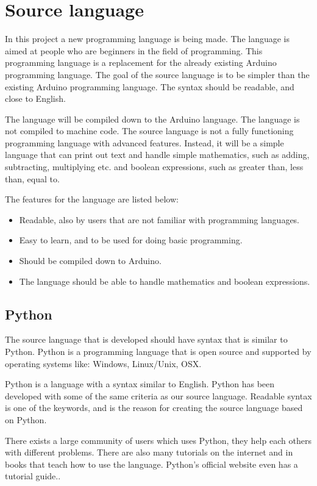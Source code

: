 \section{Source language}
In this project a new programming language is being made. The language is aimed at people who are beginners in the field of programming. This programming language is a replacement for the already existing Arduino programming language. 
The goal of the source language is to be simpler than the existing Arduino programming language. The syntax should be readable, and close to English.

The language will be compiled down to the Arduino language. The language is not compiled to machine code. The source language is not a fully functioning programming language with advanced features. Instead, it will be a simple language that can print out text and handle simple mathematics, such as adding, subtracting, multiplying etc. and boolean expressions, such as greater than, less than, equal to.

The features for the language are listed below:
\begin{itemize}
	\item Readable, also by users that are not familiar with programming languages.
	\item Easy to learn, and to be used for doing basic programming.
	\item Should be compiled down to Arduino.
	\item The language should be able to handle mathematics and boolean expressions.
\end{itemize}

\subsection{Python}
The source language that is developed should have syntax that is similar to Python. Python is a programming language that is open source and supported by operating systems like: Windows, Linux/Unix, OSX.

Python is a language with a syntax similar to English.
Python has been developed with some of the same criteria as our source language. Readable syntax is one of the keywords, and is the reason for creating the source language based on Python.
 
\cite{python:official:about}
There exists a large community of users which uses Python, they help each others with different problems. There are also many tutorials on the internet and in books that teach how to use the language. Python's official website even has a tutorial guide.\cite{python:official:tutorial}.
